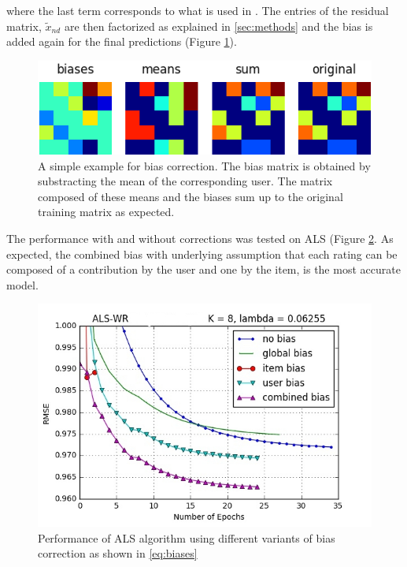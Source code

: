 where the last term corresponds to what is used in \cite{Koren2009}. 
The entries of the residual matrix, $\widetilde{x}_{nd}$ are then factorized as explained
in \ref{sec:methods} and the bias is added again for the final predictions
(Figure \ref{fig:biasmatrix}).

\begin{figure}[htbp]
  \centering
  \includegraphics[width=.7\columnwidth]{figures/biases_user.png}
  \caption{A simple example for bias correction. The bias matrix is obtained by
  substracting the mean of the corresponding user. The matrix composed of these
  means and the biases sum up to the original training matrix as expected.}
  \label{fig:biasmatrix}
\end{figure}

The performance with and without corrections was tested on ALS (Figure
\ref{fig:bias}. As expected, the combined bias with underlying assumption that each rating can
be composed of a contribution by the user and one by the item, is the most
accurate model. 

\begin{figure}[htbp]
  \centering
  \includegraphics[width=.7\columnwidth]{figures/bias.jpg}
  \vspace{-3mm}
  \caption{Performance of ALS algorithm using different variants of bias
  correction as shown in \eqref{eq:biases}}
  \label{fig:bias}
\end{figure}
